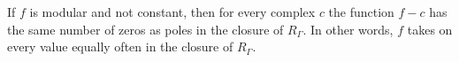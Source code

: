 If $f$ is modular and not constant, then for every complex $c$ the function $f - c$ has the same number of zeros as poles in the closure of $R_{\Gamma}$. In other words, $f$ takes on every value equally often in the closure of $R_{\Gamma}$.
